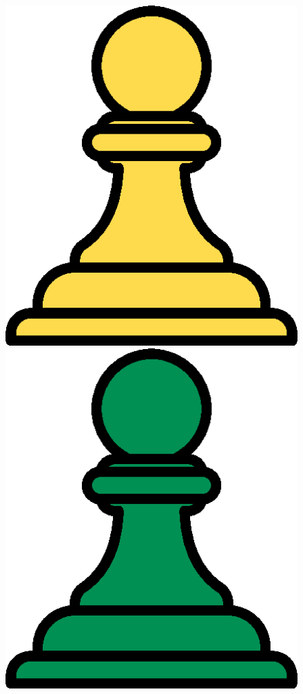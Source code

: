 \documentclass[a6paper, 12pt, parskip=half, DIV=14]{scrartcl}
\begin{document}
\begin{itemize}[leftmargin=4ex, nosep]
\begin{figure}[h]
    \includegraphics[scale=0.3]{Images/pawn_yellow.png}
    \includegraphics[scale=0.3]{Images/pawn_green.png}

\end{figure}
\end{itemize}
\end{document}
